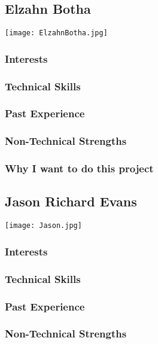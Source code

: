 
\subsection{Elzahn Botha}
\texttt{[image: ElzahnBotha.jpg]}

\subsubsection{Interests}
\subsubsection{Technical Skills}
\subsubsection{Past Experience}
\subsubsection{Non-Technical Strengths}
\subsubsection{Why I want to do this project}

\subsection{Jason Richard Evans}
\texttt{[image: Jason.jpg]}

\subsubsection{Interests}
\subsubsection{Technical Skills}
\subsubsection{Past Experience}
\subsubsection{Non-Technical Strengths}

